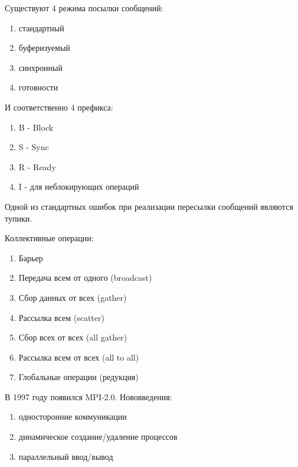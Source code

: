 \documentclass[a4paper,12pt]{article}
\begin{document}
	Существуют 4 режима посылки сообщений:
	\begin{enumerate}
		\item стандартный
		\item буферизуемый
		\item синхронный
		\item готовности
	\end{enumerate}
	И соответственно 4 префикса:
	\begin{enumerate}
		\item B - Block
		\item S - Sync
		\item R - Ready
		\item I - для неблокирующих операций
	\end{enumerate}
	Одной из стандартных ошибок при реализации пересылки сообщений являются тупики.
	
	Коллективные операции:
	\begin{enumerate}
		\item Барьер
		\item Передача всем от одного (broadcast)
		\item Сбор данных от всех (gather)
		\item Рассылка всем (scatter)
		\item Сбор всех от всех (all gather)
		\item Рассылка всем от всех (all to all)
		\item Глобальные операции (редукция)
	\end{enumerate}
	В 1997 году появился MPI-2.0. Нововведения:
	\begin{enumerate}
		\item односторонние коммуникации
		\item динамическое создание/удаление процессов
		\item параллельный ввод/вывод
	\end{enumerate}
\end{document}

